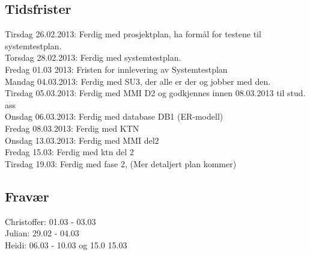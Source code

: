 \subsection{Tidsfrister}
Tirsdag 26.02.2013: Ferdig med prosjektplan, ha formål for testene til systemtestplan. \\
Torsdag 28.02.2013: Ferdig med systemtestplan. \\
Fredag 01.03 2013: Fristen for innlevering av Systemtestplan \\
Mandag 04.03.2013: Ferdig med SU3, der alle er der og jobber med den. \\
Tirsdag 05.03.2013: Ferdig med MMI D2 og godkjennes innen 08.03.2013 til stud. ass \\
Onsdag 06.03.2013: Ferdig med database DB1 (ER-modell) \\
Fredag 08.03.2013: Ferdig med KTN \\
Onsdag 13.03.2013: Ferdig med MMI del2 \\
Fredag 15.03: Ferdig med ktn del 2 \\
Tirsdag 19.03: Ferdig med fase 2, (Mer detaljert plan kommer)

\subsection{Fravær}
Christoffer: 01.03 - 03.03\\
Julian: 29.02 - 04.03 \\
Heidi: 06.03 - 10.03 og 15.0 15.03\\